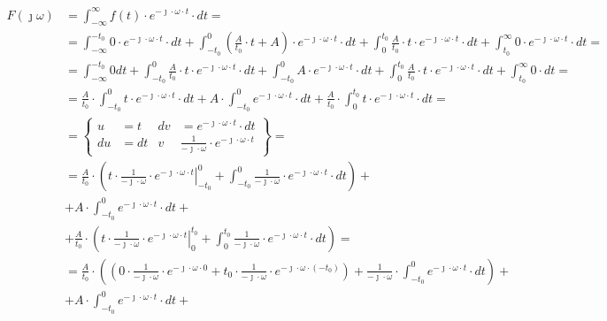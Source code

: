 \begin{task}
\begin{align*}
F(\jmath \omega )&=\int_{-\infty }^{\infty}f(t) \cdot e^{-\jmath \cdot \omega \cdot t}\cdot dt=\\
&=\int_{-\infty }^{-t_0} 0 \cdot e^{-\jmath \cdot \omega \cdot t} \cdot dt + \int_{-t_0 }^{0} \left(\frac{A}{t_0} \cdot t + A \right) \cdot e^{-\jmath \cdot \omega \cdot t} \cdot dt + \int_{0}^{t_0} \frac{A}{t_0} \cdot t \cdot e^{-\jmath \cdot \omega \cdot t} \cdot dt + \int_{t_0 }^{\infty} 0 \cdot e^{-\jmath \cdot \omega \cdot t} \cdot dt = \\
&=\int_{-\infty }^{-t_0} 0 dt + \int_{-t_0 }^{0} \frac{A}{t_0} \cdot t \cdot e^{-\jmath \cdot \omega \cdot t} \cdot dt + \int_{-t_0 }^{0} A \cdot e^{-\jmath \cdot \omega \cdot t} \cdot dt + \int_{0}^{t_0} \frac{A}{t_0} \cdot t \cdot e^{-\jmath \cdot \omega \cdot t} \cdot dt + \int_{t_0 }^{\infty} 0 \cdot dt = \\
&=\frac{A}{t_0} \cdot \int_{-t_0 }^{0}  t \cdot e^{-\jmath \cdot \omega \cdot t} \cdot dt + A \cdot \int_{-t_0 }^{0} e^{-\jmath \cdot \omega \cdot t} \cdot dt + \frac{A}{t_0} \cdot \int_{0}^{t_0} t \cdot e^{-\jmath \cdot \omega \cdot t} \cdot dt = \\
&=\begin{Bmatrix}
u &= t & dv &= e^{-\jmath \cdot \omega \cdot t} \cdot dt \\
du&=dt & v & \frac{1}{-\jmath \cdot \omega} \cdot e^{-\jmath \cdot \omega \cdot t}
\end{Bmatrix}=\\
&=\frac{A}{t_0} \cdot \left(\left. t \cdot \frac{1}{-\jmath \cdot \omega} \cdot e^{-\jmath \cdot \omega \cdot t}\right|_{-t_0 }^{0} + \int_{-t_0 }^{0} \frac{1}{-\jmath \cdot \omega} \cdot e^{-\jmath \cdot \omega \cdot t} \cdot dt\right) + \\
&+ A \cdot \int_{-t_0 }^{0} e^{-\jmath \cdot \omega \cdot t} \cdot dt + \\
&+\frac{A}{t_0} \cdot \left(\left. t \cdot \frac{1}{-\jmath \cdot \omega} \cdot e^{-\jmath \cdot \omega \cdot t}\right|_{0 }^{t_0} + \int_{0 }^{t_0} \frac{1}{-\jmath \cdot \omega} \cdot e^{-\jmath \cdot \omega \cdot t} \cdot dt\right)  = \\
&=\frac{A}{t_0} \cdot \left(\left( 0 \cdot \frac{1}{-\jmath \cdot \omega} \cdot e^{-\jmath \cdot \omega \cdot 0} + t_0 \cdot \frac{1}{-\jmath \cdot \omega} \cdot e^{-\jmath \cdot \omega \cdot (-t_0)}\right) + \frac{1}{-\jmath \cdot \omega} \cdot \int_{-t_0 }^{0} e^{-\jmath \cdot \omega \cdot t} \cdot dt\right) + \\
&+ A \cdot \int_{-t_0 }^{0} e^{-\jmath \cdot \omega \cdot t} \cdot dt + \\

\end{align*}
\end{task}
